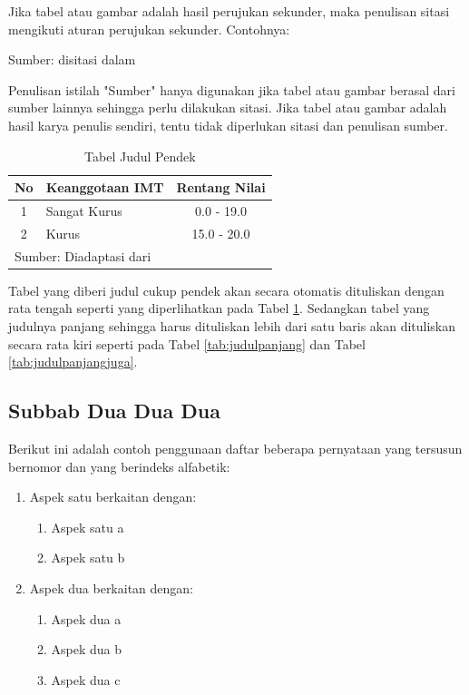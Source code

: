 Jika tabel atau gambar adalah hasil perujukan sekunder, maka penulisan sitasi mengikuti aturan perujukan sekunder. Contohnya:
\begin{displayquote}
  Sumber: \cite{anggariawan:2014} disitasi dalam \cite{Bloggs1950}
\end{displayquote}

Penulisan istilah "Sumber" hanya digunakan jika tabel atau gambar berasal dari sumber lainnya sehingga perlu dilakukan sitasi. Jika tabel atau gambar adalah hasil karya penulis sendiri, tentu tidak diperlukan sitasi dan penulisan sumber.

\begin{table}
  \centering
  \renewcommand{\arraystretch}{1.2}
  \caption{Tabel Judul Pendek}
  \begin{tabular}{clc}
    \hline
    No & Keanggotaan IMT & Rentang Nilai \\
    \hline
    1 & Sangat Kurus & 0.0 - 19.0 \\
    2 & Kurus & 15.0 - 20.0 \\
    \hline
    \multicolumn{3}{l}{\footnotesize{Sumber: Diadaptasi dari \cite{anggariawan:2014}}} \\
  \end{tabular}
  \label{tab:judulpendek}
\end{table}

Tabel yang diberi judul cukup pendek akan secara otomatis dituliskan dengan rata tengah seperti yang diperlihatkan pada Tabel \ref{tab:judulpendek}. Sedangkan tabel yang judulnya panjang sehingga harus dituliskan lebih dari satu baris akan dituliskan secara rata kiri seperti pada Tabel \ref{tab:judulpanjang} dan Tabel \ref{tab:judulpanjangjuga}. 


\subsection{Subbab Dua Dua Dua}

Berikut ini adalah contoh penggunaan daftar beberapa pernyataan yang tersusun bernomor dan yang berindeks alfabetik:

\begin{enumerate}
  \item Aspek satu berkaitan dengan: 
  \begin{enumerate}[label=\alph*.]
    \item Aspek satu a
    \item Aspek satu b 
  \end{enumerate}
  \item Aspek dua berkaitan dengan: 
  \begin{enumerate}[label=\alph*.]
    \item Aspek dua a
    \item Aspek dua b
    \item Aspek dua c 
  \end{enumerate}
\end{enumerate}

